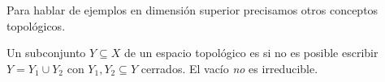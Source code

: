 \documentclass[12pt]{memoir}
\begin{document}
Para hablar de ejemplos en dimensión superior precisamos otros conceptos topológicos.

\begin{Def}\label{def:conj-irreducible}
  Un subconjunto $Y\subseteq X$ de un espacio topológico es  si no es posible escribir $Y=Y_1\cup Y_2$ con $Y_1,Y_2\subseteq Y$ cerrados. El vacío \emph{no} es irreducible.
\end{Def}
\end{document}

